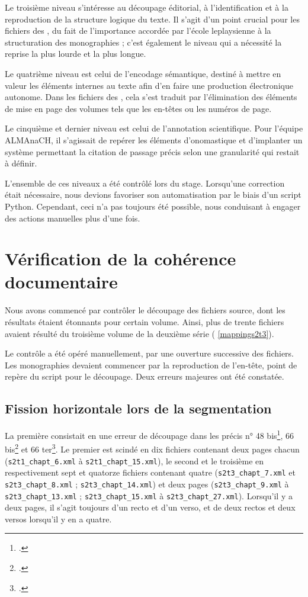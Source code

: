 Le troisième niveau s'intéresse au découpage éditorial, \cad{} à l'identification et à la reproduction de la structure logique du texte. Il s'agit d'un point crucial pour les fichiers des \odm, du fait de l'importance accordée par l'école leplaysienne à la structuration des monographies ; c'est également le niveau qui a nécessité la reprise la plus lourde et la plus longue.

Le quatrième niveau est celui de l'encodage sémantique, destiné à mettre en valeur les éléments internes au texte afin d'en faire une production électronique autonome. Dans les fichiers des \odm, cela s'est traduit par l'élimination des éléments de mise en page des volumes tels que les en-têtes ou les numéros de page.

Le cinquième et dernier niveau est celui de l'annotation scientifique. Pour l'équipe ALMAnaCH, il s'agissait de repérer les éléments d'onomastique et d'implanter un système permettant la citation de passage précis selon une granularité qui restait à définir.

L'ensemble de ces niveaux a été contrôlé lors du stage. Lorsqu'une correction était nécessaire, nous devions favoriser son automatisation par le biais d'un script Python. Cependant, ceci n’a pas toujours été possible, nous conduisant à engager des actions manuelles plus d'une fois.

\section{Vérification de la cohérence documentaire}

Nous avons commencé par contrôler le découpage des fichiers source, dont les résultats étaient étonnants pour certain volume. Ainsi, plus de trente fichiers avaient résulté du troisième volume de la deuxième série (\ann{} \ref{mappings2t3}).

Le contrôle a été opéré manuellement, par une ouverture successive des fichiers. Les monographies devaient commencer par la reproduction de l'en-tête, point de repère du script \lse{} pour le découpage. Deux erreurs majeures ont été constatée.

\subsection{Fission horizontale lors de la segmentation}

La première consistait en une erreur de découpage dans les précis n° 48 bis\footcite{mono048b}, 66 bis\footcite{mono066b} et 66 ter\footcite{mono066c}. Le premier est scindé en dix fichiers contenant deux pages chacun (\texttt{s2t1\_chapt\_6.xml} à \texttt{s2t1\_chapt\_15.xml}), le second et le troisième en respectivement sept et quatorze fichiers contenant quatre (\texttt{s2t3\_chapt\_7.xml} et \texttt{s2t3\_chapt\_8.xml} ; \texttt{s2t3\_chapt\_14.xml}) et deux pages (\texttt{s2t3\_chapt\_9.xml} à \texttt{s2t3\_chapt\_13.xml} ; \texttt{s2t3\_\-chapt\_15.xml} à \texttt{s2t3\_chapt\_27.xml}). Lorsqu'il y a deux pages, il s'agit toujours d'un recto et d'un verso, et de deux rectos et deux versos lorsqu'il y en a quatre.

